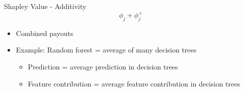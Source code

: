 \begin{frame}{Shapley Value - Additivity}
	\begin{equation}
		\phi_j+\phi_j^{+}
	\end{equation}
	\begin{itemize}
		\item Combined payouts
		\item Example: Random forest = average of many decision trees
		\begin{itemize}
			\item Prediction = average prediction in decision trees
			\item Feature contribution = average feature contribution in decision trees
		\end{itemize}
	\end{itemize}
\end{frame}